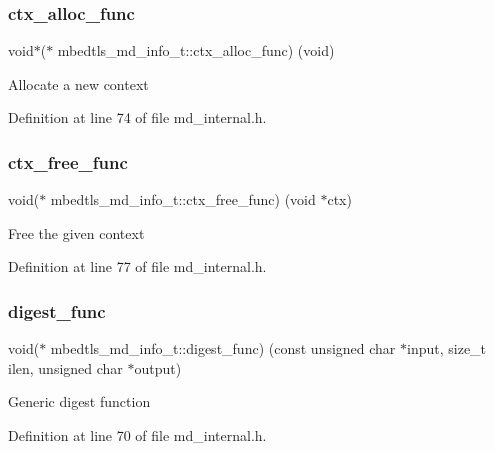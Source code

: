 \subsubsection{\texorpdfstring{ctx\+\_\+alloc\+\_\+func}{ctx\_alloc\_func}}
{\footnotesize\ttfamily void$\ast$($\ast$ mbedtls\+\_\+md\+\_\+info\+\_\+t\+::ctx\+\_\+alloc\+\_\+func) (void)}

Allocate a new context 

Definition at line 74 of file md\+\_\+internal.\+h.

\mbox{\label{structmbedtls__md__info__t_adc08407de7df014fc25e95cefb453073}} 
\subsubsection{\texorpdfstring{ctx\+\_\+free\+\_\+func}{ctx\_free\_func}}
{\footnotesize\ttfamily void($\ast$ mbedtls\+\_\+md\+\_\+info\+\_\+t\+::ctx\+\_\+free\+\_\+func) (void $\ast$ctx)}

Free the given context 

Definition at line 77 of file md\+\_\+internal.\+h.

\mbox{\label{structmbedtls__md__info__t_a64b2000256fe6384d3af30a1e2b20282}} 
\subsubsection{\texorpdfstring{digest\+\_\+func}{digest\_func}}
{\footnotesize\ttfamily void($\ast$ mbedtls\+\_\+md\+\_\+info\+\_\+t\+::digest\+\_\+func) (const unsigned char $\ast$input, size\+\_\+t ilen, unsigned char $\ast$output)}

Generic digest function 

Definition at line 70 of file md\+\_\+internal.\+h.

\mbox{\label{structmbedtls__md__info__t_a5d5edae28954af967e8c3f85ed468926}} 
